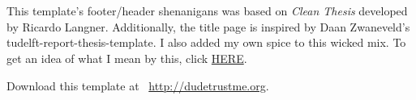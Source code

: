 \newpage
\pagestyle{empty}
\hfill
\vfill
{}
\section*{} %

This template's footer/header shenanigans was based on \textit{Clean Thesis} developed by Ricardo Langner. Additionally, the title page is inspired by Daan Zwaneveld's tudelft-report-thesis-template. I also added my own spice to this wicked mix. To get an idea of what I mean by this, click \href{https://drive.google.com/file/d/1e4ZUKQirtbow2bI47cqxHyp-9HPs9Ikc/view?usp=sharing}{\color{blue2}HERE}.

Download this template at \, \url{http://dudetrustme.org}.


